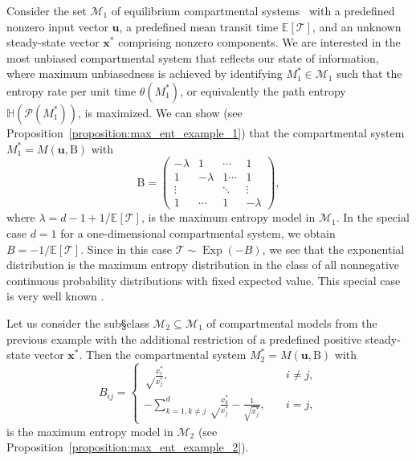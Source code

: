 \documentclass[smallextended]{svjour3}
\makeatletter
\renewcommand*{\eqref}[1]{%
  \hyperref[{#1}]{\textup{\tagform@{\ref*{#1}}}}%
}
\renewcommand{\tens}[1]{\mathrm{#1}}
\renewcommand{\vec}[1]{\mathbf{#1}}
\newcommand{\E}{\mathbb{E}}
\newcommand{\TT}{\mathcal{T}}
\renewcommand{\H}{\mathbb{H}}
\newcommand{\Exp}{\operatorname{Exp}}
\newcommand{\suml}{\sum\limits}
\makeatother
\begin{document}
\begin{example}
\label{max_ent_example_1}
Consider the set $\mathcal{M}_1$ of equilibrium compartmental systems~\eqref{eqn:lin_CS_sys} with a predefined nonzero input vector $\vec{u}$, a predefined mean transit time $\E\left[\TT\right]$, and an unknown steady-state vector $\vec{x}^\ast$ comprising nonzero components.
We are interested in the most unbiased compartmental system that reflects our state of information, where maximum unbiasedness is achieved by identifying $M^\ast_1\in\mathcal{M}_1$ such that the entropy rate per unit time $\theta(M^\ast_1)$, or equivalently the path entropy $\H(\mathcal{P}(M^\ast_1))$, is maximized. 
We can show (see Proposition~\ref{proposition:max_ent_example_1}) that the compartmental system $M^\ast_1=M(\vec{u},\tens{B})$ with 
\begin{equation}
	\tens{B} = \begin{pmatrix}
    -\lambda & 1 & \cdots & 1\\
		1 & -\lambda & 1 \cdots & 1 \\
		\vdots & & \ddots & \vdots\\
		1 & \cdots & 1 & -\lambda
  \end{pmatrix},
\end{equation}
where $\lambda=d-1+1/\E\left[\TT\right]$, 		
is the maximum entropy model in $\mathcal{M}_1$.
In the special case $d=1$ for a one-dimensional compartmental system, we obtain $B=-1/\E\left[\TT\right]$.
Since in this case $\TT\sim\Exp(-B)$, we see that the exponential distribution is the maximum entropy distribution in the class of all nonnegative continuous probability distributions with fixed expected value.
This special case is very well known \citep[Example~12.2.5]{Cover2006}.
\end{example}

\begin{example}
\label{max_ent_example_2}
Let us consider the sub§class $\mathcal{M}_2\subseteq\mathcal{M}_1$ of compartmental models from the previous example with the additional restriction of a predefined positive steady-state vector $\vec{x}^\ast$.
Then the compartmental system $M^\ast_2=M(\vec{u},\tens{B})$ with
\begin{equation}
	B_{ij} = \begin{cases}
    \sqrt\frac{x_i^\ast}{x_j^\ast},\quad & i\neq j,\\
		-\suml_{k=1,k\neq j}^d \sqrt\frac{x_k^\ast}{x_j^\ast} - \frac{1}{\sqrt{x_j^\ast}}, \quad &i=j,
		\end{cases}
  \end{equation}
is the maximum entropy model in $\mathcal{M}_2$ (see Proposition~\ref{proposition:max_ent_example_2}).
\end{example}
\end{document}
